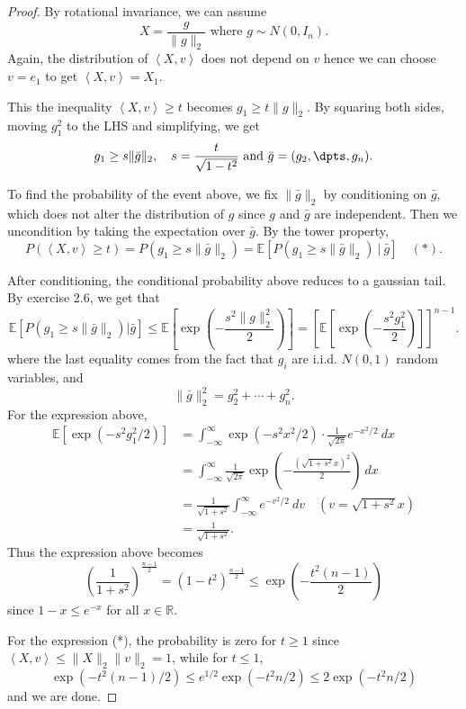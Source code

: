 \begin{proof}
By rotational invariance, we can assume 
\[ X = \frac{g}{\lVert g \rVert_{2}} \text{ where } g \sim N(0, I_n). \]
Again, the distribution of $\left\langle X, v \right\rangle$ does not depend on $v$ hence we can choose 
$v = e_1$ to get $\left\langle X, v \right\rangle = X_1$.

This the inequality $\left\langle X, v \right\rangle \geq t$ becomes $g_1 \geq t \lVert g \rVert_{2}$. 
By squaring both sides, moving $g_1^2$ to the LHS and simplifying, we get 
\[ g_1 \geq s \lVert \bar{g} \rVert_{2}, \quad s = \frac{t}{\sqrt{1 - t^2}} \text{ and } 
\bar{g} = (g_2, \dpts, g_n). \]

To find the probability of the event above, we fix $\lVert \bar{g} \rVert_{2}$ by conditioning on $\bar{g}$, 
which does not alter the distribution of $g$ since $g$ and $\bar{g}$ are independent. Then we uncondition 
by taking the expectation over $\bar{g}$. By the tower property, 
\[ P(\left\langle X, v \right\rangle \geq t) 
= P(g_1 \geq s \lVert \bar{g} \rVert_{2}) = \mathbb{E}[P(g_1 \geq s \lVert \bar{g} \rVert_{2}) \ | \ \bar{g}] 
\quad (*). \]

After conditioning, the conditional probability above reduces to a gaussian tail. By exercise 2.6, 
we get that 
\[ \mathbb{E}[P(g_1 \geq s \lVert \bar{g} \rVert_{2}) | \bar{g}] 
\leq \mathbb{E}[\exp{\left( -\frac{s^2 \lVert g \rVert_{2}^2}{2} \right)}] 
= \left[ \mathbb{E}[\exp{\left( -\frac{s^2 g_1^2}{2} \right)}] \right]^{n - 1}. \]
where the last equality comes from the fact that $g_i$ are i.i.d. $N(0, 1)$ random variables, and 
\[ \lVert \bar{g} \rVert_{2}^2 = g_2^2 + \cdots + g_n^2. \]
For the expression above, 
\begin{align*}
	\mathbb{E}[\exp{(-s^2 g_1^2 / 2)}] 
	&= \int_{-\infty}^{\infty} \exp{(-s^2 x^2 / 2)} \cdot 
	\frac{1}{\sqrt{2 \pi}} e^{-x^2 / 2} \ dx \\
	&= \int_{-\infty}^{\infty} \frac{1}{\sqrt{2 \pi}} \exp{\left( -\frac{(\sqrt{1 + s^2}x)^2}{2} \right)} \ dx \\
	&= \frac{1}{\sqrt{1 + s^2}} \int_{-\infty}^{\infty} e^{-v^2 / 2} \ dv \quad (v = \sqrt{1 + s^2}x) \\
	&= \frac{1}{\sqrt{1 + s^2}}.
\end{align*}
Thus the expression above becomes 
\[ \left( \frac{1}{1 + s^2} \right)^{\frac{n - 1}{2}} = (1 - t^2)^{\frac{n - 1}{2}} 
\leq \exp{\left( -\frac{t^2(n - 1)}{2} \right)} \]
since $1 - x \leq e^{-x}$ for all $x \in \mathbb{R}$. 

For the expression (*), the probability is zero for $t \geq 1$ since $\left\langle X, v \right\rangle \leq 
\lVert X \rVert_{2} \lVert v \rVert_{2} = 1$, while for $t \leq 1$, 
\[ \exp{(-t^2(n - 1) / 2)} \leq e^{1/2}\exp{(-t^2 n / 2)} \leq 2\exp{(-t^2 n / 2)} \]
and we are done.
\end{proof}

